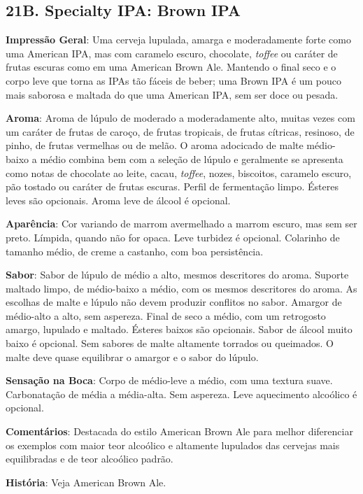 \subsection*{21B. Specialty IPA: Brown IPA}
\textbf{Impressão Geral}: Uma cerveja lupulada, amarga e moderadamente forte como uma American IPA, mas com caramelo escuro, chocolate, \textit{toffee} ou caráter de frutas escuras como em uma American Brown Ale. Mantendo o final seco e o corpo leve que torna as IPAs tão fáceis de beber; uma Brown IPA é um pouco mais saborosa e maltada do que uma American IPA, sem ser doce ou pesada.

\textbf{Aroma}: Aroma de lúpulo de moderado a moderadamente alto, muitas vezes com um caráter de frutas de caroço, de frutas tropicais, de frutas cítricas, resinoso, de pinho, de frutas vermelhas ou de melão. O aroma adocicado de malte médio-baixo a médio combina bem com a seleção de lúpulo e geralmente se apresenta como notas de chocolate ao leite, cacau, \textit{toffee}, nozes, biscoitos, caramelo escuro, pão tostado ou caráter de frutas escuras. Perfil de fermentação limpo. Ésteres leves são opcionais. Aroma leve de álcool é opcional.

\textbf{Aparência}: Cor variando de marrom avermelhado a marrom escuro, mas sem ser preto. Límpida, quando não for opaca. Leve turbidez é opcional. Colarinho de tamanho médio, de creme a castanho, com boa persistência.

\textbf{Sabor}: Sabor de lúpulo de médio a alto, mesmos descritores do aroma. Suporte maltado limpo, de médio-baixo a médio, com os mesmos descritores do aroma. As escolhas de malte e lúpulo não devem produzir conflitos no sabor. Amargor de médio-alto a alto, sem aspereza. Final de seco a médio, com um retrogosto amargo, lupulado e maltado. Ésteres baixos são opcionais. Sabor de álcool muito baixo é opcional. Sem sabores de malte altamente torrados ou queimados. O malte deve quase equilibrar o amargor e o sabor do lúpulo.

\textbf{Sensação na Boca}: Corpo de médio-leve a médio, com uma textura suave. Carbonatação de média a média-alta. Sem aspereza. Leve aquecimento alcoólico é opcional.

\textbf{Comentários}: Destacada do estilo American Brown Ale para melhor diferenciar os exemplos com maior teor alcoólico e altamente lupulados das cervejas mais equilibradas e de teor alcoólico padrão.

\textbf{História}: Veja American Brown Ale.

